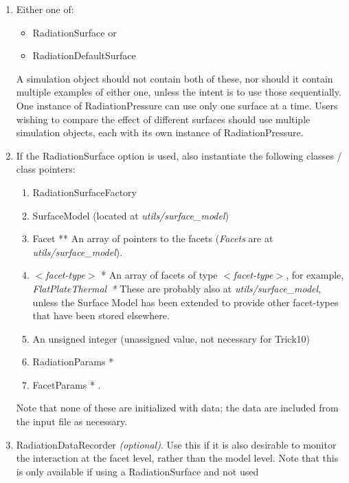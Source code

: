 \begin{enumerate}
\begin{enumerate}
    \item{} Either one of:
      \begin{itemize}
        \item{RadiationSurface} or
        \item{RadiationDefaultSurface}
      \end{itemize}
      A simulation object should not contain both of these,
      nor should it contain multiple examples of either one,
      unless the intent is to use those sequentially.
      One instance of RadiationPressure can use only one surface at a time.
      Users wishing to compare the effect of different surfaces should use
      multiple simulation objects, each with its own instance of
      RadiationPressure.
    \item{} If the RadiationSurface option is used,
      also instantiate the following classes / class pointers:
      \begin{enumerate}
        \item{RadiationSurfaceFactory}
        \item{SurfaceModel} (located at \textit{utils/surface\_model})
        \item{Facet **} \newline
          An array of pointers to the facets
          (\textit{Facets} are at \textit{utils/surface\_model}).
        \item{\textit{$<$facet-type$>$} *} \newline
          An array of facets of
          type \textit{$<$facet-type$>$}, for example, \textit{FlatPlateThermal~*}
          These are probably also at \textit{utils/surface\_model}, unless the
          Surface Model has been extended to provide other facet-types
          that have been stored elsewhere.
        \item{} An unsigned integer (unassigned value, not necessary for Trick10)
        \item{RadiationParams *}
        \item{FacetParams *} .
      \end{enumerate}
        Note that none of these are initialized with data;
        the data are included from the input file as necessary.
    \item{RadiationDataRecorder \textit{(optional)}}. \newline
      Use this if it is also
      desirable to monitor the interaction at the facet level,
      rather than the model level.
      Note that this is only available if using a RadiationSurface and not used

\end{enumerate}
\end{enumerate}
